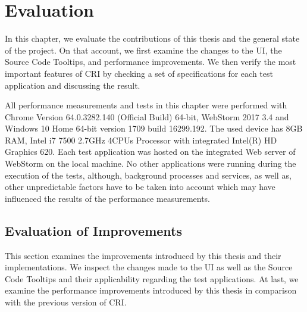 \chapter{Evaluation}
\label{ch:Evaluation}
In this chapter, we evaluate the contributions of this thesis and the general state of the project. On that account, we first examine the changes to the UI, the Source Code Tooltips, and performance improvements. We then verify the most important features of CRI by checking a set of specifications for each test application and discussing the result.

All performance measurements and tests in this chapter were performed with Chrome Version 64.0.3282.140 (Official Build) 64-bit, WebStorm 2017 3.4 and Windows 10 Home 64-bit version 1709 build 16299.192. The used device has 8GB RAM, Intel i7 7500 2.7GHz 4CPUs Processor with integrated Intel(R) HD Graphics 620. Each test application was hosted on the integrated Web server of WebStorm on the local machine. No other applications were running during the execution of the tests, although, background processes and services, as well as, other unpredictable factors have to be taken into account which may have influenced the results of the performance measurements.

\section{Evaluation of Improvements}
This section examines the improvements introduced by this thesis and their implementations. We inspect the changes made to the UI as well as the Source Code Tooltips and their applicability regarding the test applications. At last, we examine the performance improvements introduced by this thesis in comparison with the previous version of CRI.

